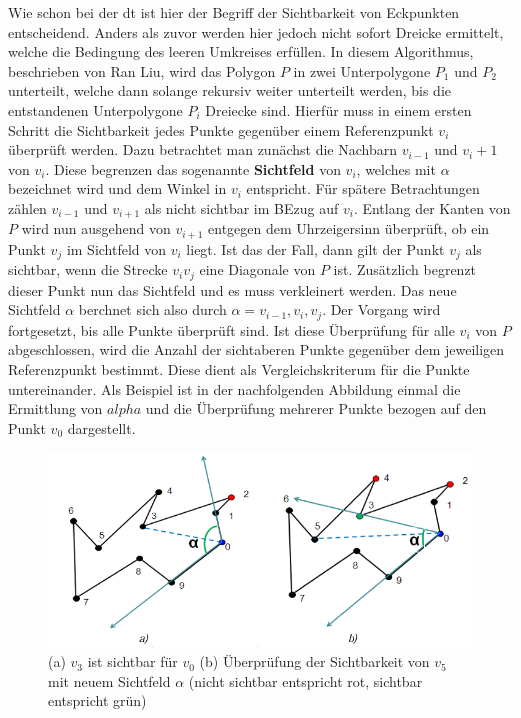 Wie schon bei der \ac{dt} ist hier der Begriff der Sichtbarkeit von Eckpunkten entscheidend. Anders als zuvor werden hier jedoch nicht sofort Dreicke ermittelt,
welche die Bedingung des leeren Umkreises erfüllen. In diesem Algorithmus, beschrieben von Ran Liu, wird das Polygon $P$ in zwei Unterpolygone $P_1$ und $P_2$ unterteilt,
welche dann solange rekursiv weiter unterteilt werden, bis die entstandenen Unterpolygone $P_i$ Dreiecke sind.\cite{newAlg}
Hierfür muss in einem ersten Schritt die Sichtbarkeit jedes Punkte gegenüber einem Referenzpunkt $v_i$ überprüft werden. Dazu betrachtet man zunächst die Nachbarn $v_{i-1}$ und $v_i+1$ 
von $v_i$. Diese begrenzen das sogenannte \textbf{Sichtfeld} von $v_i$, welches mit $\alpha$ bezeichnet wird und dem Winkel in $v_i$ entspricht. Für spätere Betrachtungen zählen $v_{i-1}$ und $v_{i+1}$ 
als nicht sichtbar im BEzug auf $v_i$. Entlang der Kanten von $P$ wird nun ausgehend von $v_{i+1}$ entgegen dem Uhrzeigersinn überprüft, ob ein Punkt $v_j$ im Sichtfeld von $v_i$ liegt.
Ist das der Fall, dann gilt der Punkt $v_j$ als sichtbar, wenn die Strecke $v_iv_j$ eine Diagonale von $P$ ist. Zusätzlich begrenzt dieser Punkt nun das Sichtfeld und es muss verkleinert werden. Das neue Sichtfeld $\alpha$ berchnet sich also durch $\alpha = v_{i-1},v_i,v_j$.
Der Vorgang wird fortgesetzt, bis alle Punkte überprüft sind. Ist diese Überprüfung für alle $v_i$ von $P$ abgeschlossen, wird die Anzahl der sichtaberen Punkte 
gegenüber dem jeweiligen Referenzpunkt bestimmt. Diese dient als Vergleichskriterum für die Punkte untereinander. Als Beispiel ist in der nachfolgenden Abbildung einmal die Ermittlung von $alpha$ und die Überprüfung 
mehrerer Punkte bezogen auf den Punkt $v_0$ dargestellt.

\begin{figure}[t]
\centering
\includegraphics[width=1\textwidth]{bilder/sichtbarkeit.png}
\caption[Sichtbarkeit von Punkten]{\centering(a) $v_3$ ist sichtbar für $v_0$ (b) Überprüfung der Sichtbarkeit von $v_5$ mit neuem Sichtfeld $\alpha$ (nicht sichtbar entspricht rot, sichtbar entspricht grün) \cite{newAlg} }
\label{fig:visibPoint}
\end{figure}

